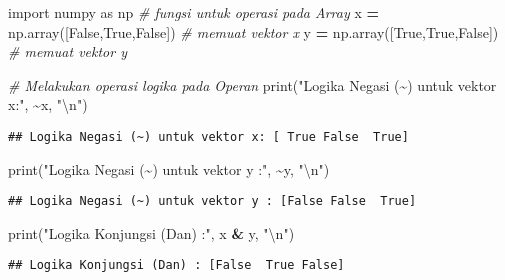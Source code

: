 \documentclass[
]{docs}
\newenvironment{Shaded}{\begin{snugshade}}{\end{snugshade}}
\newcommand{\BuiltInTok}[1]{#1}
\newcommand{\CharTok}[1]{\textcolor[rgb]{0.31,0.60,0.02}{#1}}
\newcommand{\CommentTok}[1]{\textcolor[rgb]{0.56,0.35,0.01}{\textit{#1}}}
\newcommand{\ImportTok}[1]{#1}
\newcommand{\NormalTok}[1]{#1}
\newcommand{\OperatorTok}[1]{\textcolor[rgb]{0.81,0.36,0.00}{\textbf{#1}}}
\newcommand{\StringTok}[1]{\textcolor[rgb]{0.31,0.60,0.02}{#1}}
\newcommand{\VariableTok}[1]{\textcolor[rgb]{0.00,0.00,0.00}{#1}}
\begin{document}
\begin{Shaded}
\begin{Highlighting}[]
\ImportTok{import}\NormalTok{ numpy }\ImportTok{as}\NormalTok{ np                }\CommentTok{\# fungsi untuk operasi pada Array}
\NormalTok{x }\OperatorTok{=}\NormalTok{ np.array([}\VariableTok{False}\NormalTok{,}\VariableTok{True}\NormalTok{,}\VariableTok{False}\NormalTok{])  }\CommentTok{\# memuat vektor x}
\NormalTok{y }\OperatorTok{=}\NormalTok{ np.array([}\VariableTok{True}\NormalTok{,}\VariableTok{True}\NormalTok{,}\VariableTok{False}\NormalTok{])   }\CommentTok{\# memuat vektor y}
 
\CommentTok{\# Melakukan operasi logika pada Operan}
\BuiltInTok{print}\NormalTok{(}\StringTok{"Logika Negasi (\textasciitilde{}) untuk vektor x:"}\NormalTok{, }\OperatorTok{\textasciitilde{}}\NormalTok{x, }\StringTok{"}\CharTok{\textbackslash{}n}\StringTok{"}\NormalTok{) }
\end{Highlighting}
\end{Shaded}

\begin{verbatim}
## Logika Negasi (~) untuk vektor x: [ True False  True]
\end{verbatim}

\begin{Shaded}
\begin{Highlighting}[]
\BuiltInTok{print}\NormalTok{(}\StringTok{"Logika Negasi (\textasciitilde{}) untuk vektor y :"}\NormalTok{, }\OperatorTok{\textasciitilde{}}\NormalTok{y, }\StringTok{"}\CharTok{\textbackslash{}n}\StringTok{"}\NormalTok{) }
\end{Highlighting}
\end{Shaded}

\begin{verbatim}
## Logika Negasi (~) untuk vektor y : [False False  True]
\end{verbatim}

\begin{Shaded}
\begin{Highlighting}[]
\BuiltInTok{print}\NormalTok{(}\StringTok{"Logika Konjungsi (Dan) :"}\NormalTok{, x }\OperatorTok{\&}\NormalTok{ y, }\StringTok{"}\CharTok{\textbackslash{}n}\StringTok{"}\NormalTok{)}
\end{Highlighting}
\end{Shaded}

\begin{verbatim}
## Logika Konjungsi (Dan) : [False  True False]
\end{verbatim}
\end{document}

